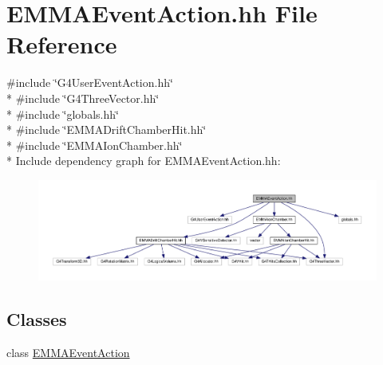 \hypertarget{EMMAEventAction_8hh}{}\section{E\+M\+M\+A\+Event\+Action.\+hh File Reference}
\label{EMMAEventAction_8hh}
{\ttfamily \#include \char`\"{}G4\+User\+Event\+Action.\+hh\char`\"{}}\\*
{\ttfamily \#include \char`\"{}G4\+Three\+Vector.\+hh\char`\"{}}\\*
{\ttfamily \#include \char`\"{}globals.\+hh\char`\"{}}\\*
{\ttfamily \#include \char`\"{}E\+M\+M\+A\+Drift\+Chamber\+Hit.\+hh\char`\"{}}\\*
{\ttfamily \#include \char`\"{}E\+M\+M\+A\+Ion\+Chamber.\+hh\char`\"{}}\\*
Include dependency graph for E\+M\+M\+A\+Event\+Action.\+hh\+:
\nopagebreak
\begin{figure}[H]
\begin{center}
\leavevmode
\includegraphics[width=350pt]{EMMAEventAction_8hh__incl}
\end{center}
\end{figure}
\subsection*{Classes}
\begin{DoxyCompactItemize}
\item 
class \hyperlink{classEMMAEventAction}{E\+M\+M\+A\+Event\+Action}
\end{DoxyCompactItemize}
